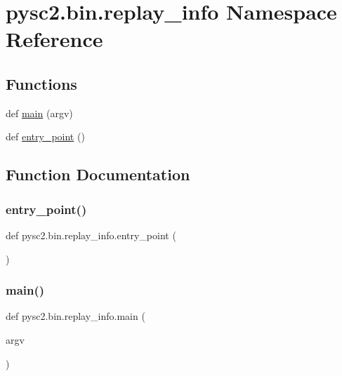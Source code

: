 \hypertarget{namespacepysc2_1_1bin_1_1replay__info}{}\section{pysc2.\+bin.\+replay\+\_\+info Namespace Reference}
\label{namespacepysc2_1_1bin_1_1replay__info}
\subsection*{Functions}
\begin{DoxyCompactItemize}
\item 
def \mbox{\hyperlink{namespacepysc2_1_1bin_1_1replay__info_a4712b70e7bf10a00126d136369c35c97}{main}} (argv)
\item 
def \mbox{\hyperlink{namespacepysc2_1_1bin_1_1replay__info_a7b8f6014c12e170330ee2e62f1e1bca4}{entry\+\_\+point}} ()
\end{DoxyCompactItemize}


\subsection{Function Documentation}
\mbox{\label{namespacepysc2_1_1bin_1_1replay__info_a7b8f6014c12e170330ee2e62f1e1bca4}} 
\subsubsection{\texorpdfstring{entry\+\_\+point()}{entry\_point()}}
{\footnotesize\ttfamily def pysc2.\+bin.\+replay\+\_\+info.\+entry\+\_\+point (\begin{DoxyParamCaption}{ }\end{DoxyParamCaption})}

\mbox{\label{namespacepysc2_1_1bin_1_1replay__info_a4712b70e7bf10a00126d136369c35c97}} 
\subsubsection{\texorpdfstring{main()}{main()}}
{\footnotesize\ttfamily def pysc2.\+bin.\+replay\+\_\+info.\+main (\begin{DoxyParamCaption}\item[{}]{argv }\end{DoxyParamCaption})}

